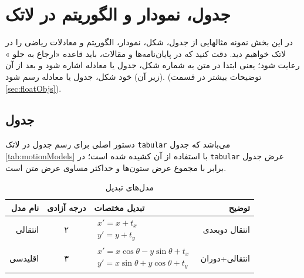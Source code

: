 
\chapter{‌جدول، نمودار و الگوریتم در لاتک}
\thispagestyle{fancy}\clearpage
\label{app:latex:more}

در این بخش نمونه مثالهایی از جدول، شکل، نمودار، الگوریتم و معادلات ریاضی را در لاتک خواهیم دید.
دقت کنید که در پایان‌نامه‌ها و مقالات، باید قاعده «ارجاع به جلو%
»
رعایت شود؛ یعنی ابتدا در متن به شماره شکل، جدول یا معادله اشاره شود و بعد از آن (زیر آن) خود شکل، جدول یا معادله رسم شود. (توضیحات بیشتر در قسمت
\ref{sec:floatObjs}).

\section{جدول}
دستور اصلی برای رسم جدول در لاتک
\verb|tabular|
می‌باشد که جدول
\eqref{tab:motionModels}
با استفاده از آن کشیده شده است؛ در
\verb|tabular|
عرض جدول برابر با مجموع عرض ستون‌ها و حداکثر مساوی عرض متن است.
\begin{table}[ht]
\caption{مدل‌های تبدیل}
\label{tab:motionModels}
\centering
\onehalfspacing
\begin{tabular}{|r|c|l|r|}
	\hline نام مدل & درجه آزادی & تبدیل مختصات & توضیح \\
	\hline انتقالی & ۲ & $\begin{aligned} x'=x+t_x \\ y'=y+t_y \end{aligned}$ & انتقال دوبعدی\\
	\hline اقلیدسی & ۳ & $\begin{aligned} x'=x\cos\theta - y\sin\theta+t_x \\ y'=x\sin\theta+y\cos\theta+t_y \end{aligned}$ & انتقالی+دوران \\
	\hline
\end{tabular}
\end{table}

